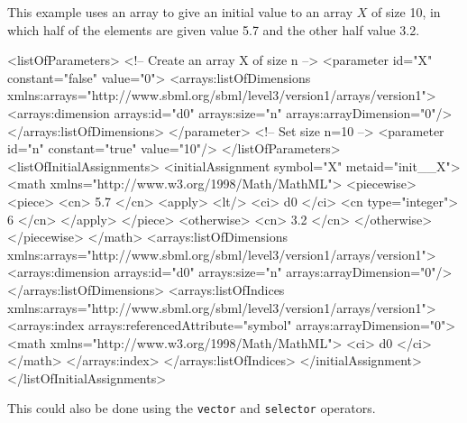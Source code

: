 This example uses an \InitialAssignment array to give an initial value to an array $X$ of size 10, in which half of the elements are given value 5.7 and the other half value 3.2. 

\begin{example}
<listOfParameters>
 <!-- Create an array X of size n -->
    <parameter id="X" constant="false" value="0">
        <arrays:listOfDimensions
            xmlns:arrays="http://www.sbml.org/sbml/level3/version1/arrays/version1">
            <arrays:dimension arrays:id="d0" arrays:size="n" arrays:arrayDimension="0"/>
        </arrays:listOfDimensions>
    </parameter>
    <!-- Set size n=10 -->
    <parameter id="n" constant="true" value="10"/>
</listOfParameters>
<listOfInitialAssignments>
    <initialAssignment symbol="X" metaid="init__X">
        <math
            xmlns="http://www.w3.org/1998/Math/MathML">
            <piecewise>
                <piece>
                    <cn> 5.7 </cn>
                    <apply>
                        <lt/>
                        <ci> d0 </ci>
                        <cn type="integer"> 6 </cn>
                    </apply>
                </piece>
                <otherwise>
                    <cn> 3.2 </cn>
                </otherwise>
            </piecewise>
        </math>
        <arrays:listOfDimensions
            xmlns:arrays="http://www.sbml.org/sbml/level3/version1/arrays/version1">
            <arrays:dimension arrays:id="d0" arrays:size="n" arrays:arrayDimension="0"/>
        </arrays:listOfDimensions>
        <arrays:listOfIndices
            xmlns:arrays="http://www.sbml.org/sbml/level3/version1/arrays/version1">
            <arrays:index arrays:referencedAttribute="symbol" arrays:arrayDimension="0">
                <math
                    xmlns="http://www.w3.org/1998/Math/MathML">
                    <ci> d0 </ci>
                </math>
            </arrays:index>
        </arrays:listOfIndices>
    </initialAssignment>
</listOfInitialAssignments>
\end{example}

This could also be done using the {\tt vector} and {\tt selector}  operators.

